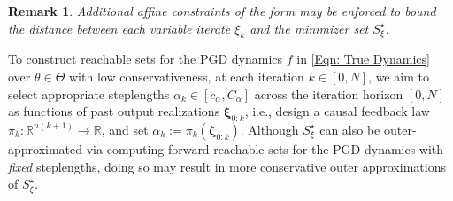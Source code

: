 \documentclass[letterpaper, 10 pt, conference]{ieeeconf}
\newcommand{\ra}{\rightarrow}
\newcommand{\R}{\mathbb{R}}
\newcommand{\?}{\stackrel{?}{=}}
\newcommand{\param}{\theta}
\newcommand{\paramSet}{\Theta}
\newcommand{\var}{\xi}
\newcommand{\varDim}{n}
\newcommand{\varOptSet}{S_\var^\star}
\newcommand{\varStacked}{\boldsymbol{\var}}
\newcommand{\paramStacked}{\boldsymbol{\param}}
\newcommand{\ratePGD}{\alpha}
\newcommand{\ratePGDMin}{c_\ratePGD}
\newcommand{\ratePGDMax}{C_\ratePGD}
\newcommand{\feedbackMap}{\pi}
\newcommand{\iterationHorizon}{N}
\newcommand{\state}{\zeta}
\newcommand{\stateStacked}{\boldsymbol{\state}}
\newcommand{\dynamicsFullState}{f}
\newcommand{\ratePGDBoundSlope}{a}
\newcommand{\ratePGDBoundOffset}{b}
\newtheorem{remark}{Remark}
\newcommand{\frank}[1]{{\textcolor[rgb]{0,0,1}{\textsf{[Frank: {#1}]}}}}
\newcommand{\antoine}[1]{{\textcolor[rgb]{1,0,0}{\textsf{[Antoine: {#1}]}}}}
\begin{document}
\begin{remark}
Additional affine constraints of the form \say{$\ratePGDBoundSlope_p^\top (\state_k, \ratePGD_k) + \ratePGDBoundOffset_p \leq 0$} 
may
be enforced
to bound the distance between each variable iterate $\var_k$ and the minimizer set $\varOptSet$.
\end{remark}

To construct reachable sets for the PGD dynamics $\dynamicsFullState$ in \eqref{Eqn: True Dynamics} over $\param \in \paramSet$ with low conservativeness,
at each iteration $k \in [0, N]$, we aim to select appropriate steplengths $\ratePGD_k \in [\ratePGDMin, \ratePGDMax]$ across the iteration horizon $[0, \iterationHorizon]$ as functions of past output realizations 
$\varStacked_{0:k}$, i.e., design a causal feedback law $\feedbackMap_k: \R^{\varDim(k+1)} \ra \R$, and set 
$\ratePGD_k := \feedbackMap_k(\stateStacked_{0:k})$.
Although $\varOptSet$ can also be outer-approximated via computing forward reachable sets for the PGD dynamics with \textit{fixed} steplengths,
doing so may result in more conservative outer approximations of $\varOptSet$.
\end{document}
